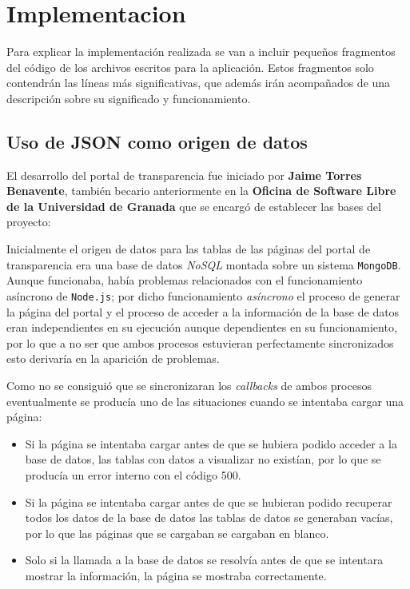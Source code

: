 \chapter{Implementacion}
 
Para explicar la implementación realizada se van a incluir pequeños
fragmentos del código de los archivos escritos para la
aplicación. Estos fragmentos solo contendrán las líneas más
significativas, que además irán acompañados de una descripción sobre
su significado y funcionamiento. 
 
\section{Uso de JSON como origen de datos}
 
El desarrollo del portal de transparencia fue iniciado por \textbf{Jaime Torres Benavente}, también becario anteriormente en la \textbf{Oficina de Software Libre de la Universidad de Granada} que se encargó de establecer las bases del proyecto:

\begin{itemize}}
	\item \
\end{itemize}
 
Inicialmente el origen de datos para las tablas de las páginas del portal de transparencia era una base de datos \textit{NoSQL} montada sobre un sistema {\tt MongoDB}. Aunque funcionaba, había problemas relacionados con el funcionamiento asíncrono de {\tt Node.js}; por dicho funcionamiento \textit{asíncrono} el proceso de generar la página del portal y el proceso de acceder a la información de la base de datos eran independientes en su ejecución aunque dependientes en su funcionamiento, por lo que a no ser que ambos procesos estuvieran perfectamente sincronizados esto derivaría en la aparición de problemas.

\bigskip
Como no se consiguió que se sincronizaran los \textit{callbacks} de ambos procesos eventualmente se producía uno de las situaciones cuando se intentaba cargar una página:

\begin{itemize}
	\item Si la página se intentaba cargar antes de que se hubiera podido acceder a la base de datos, las tablas con datos a visualizar no existían, por lo que se producía un error interno con el código 500.
	\item Si la página se intentaba cargar antes de que se hubieran podido recuperar todos los datos de la base de datos las tablas de datos se generaban vacías, por lo que las páginas que se cargaban se cargaban en blanco.
	\item Solo si la llamada a la base de datos se resolvía antes de que se intentara mostrar la información, la página se mostraba correctamente. 
\end{itemize}

